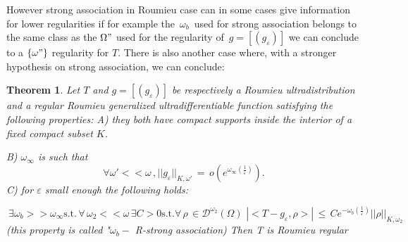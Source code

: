 \documentclass[12pt,a4paper]{amsart}
\newtheorem{theorem}{Theorem}[section]
\begin{document}
  
      However strong association in Roumieu case can in some cases give information for lower regularities 
       if for example the $\,\omega_b\,$ used for strong association belongs to the same class as the $\Omega"$ used for the regularity of $\, g = [(g_\varepsilon)]$
       we can conclude to a $\{\omega"\}$ regularity for $T$.
       There is also another case where, with a stronger hypothesis on strong association, we can conclude:
       \begin{theorem}
Let $T$ and $g=[(g_\varepsilon)]$ be respectively a Roumieu ultradistribution and a regular Roumieu generalized ultradifferentiable function satisfying the following properties: 
A) they both have compact supports inside the interior of a fixed compact subset $K$.

B) $\omega_\infty$ is such that 
$$\forall \omega' << \omega \,,
||g_\varepsilon||_{K,\omega'}\,=\,
o(e^{\omega_\infty (\frac{1}{\varepsilon})}) .$$
C) for $\varepsilon$  small enough the following holds:

\begin{equation*}
\
\exists \omega_b >> \omega_\infty \mbox{s.t.} \,
\forall\,\omega_2 <<\omega \,\exists C>0 \mbox{s.t.}
\forall \,\rho\,\in \mathcal{D}^{\omega_2}(\Omega )\,
 \,|<T-g_\varepsilon,\rho>|\,\leq\,
Ce^{-\omega_b(\frac{1}{\varepsilon})} 
||\rho||_{K,\omega_2}
\end{equation*}
(this property is called "$\omega_b-$ R-strong association) 
Then T is Roumieu regular 
\end{theorem}
\end{document}

